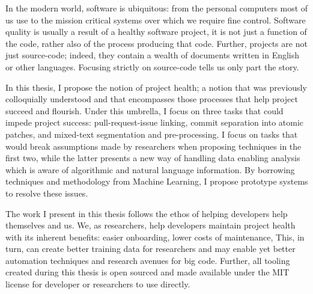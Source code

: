 In the modern world, software is ubiquitous: from the personal computers most of
us use to the mission critical systems over which we require fine control.
Software quality is usually a result of a healthy software project, \ie it is
not just a function of the code, rather also of the process producing that code.
Further, projects are not just source-code; indeed, they contain a wealth of
documents written in English or other languages. Focusing strictly on
source-code tells us only part the story.

In this thesis, I propose the notion of project health; a notion that was
previously colloquially understood and that encompasses those processes that
help project succeed and flourish. Under this umbrella, I focus on three tasks
that could impede project success: pull-request-issue linking, commit separation
into atomic patches, and mixed-text segmentation and pre-processing. I focus on
tasks that would break assumptions made by researchers when proposing techniques
in the first two, while the latter presents a new way of handling data enabling
analysis which is aware of algorithmic and natural language information. By
borrowing techniques and methodology from Machine Learning, I propose prototype
systems to resolve these issues.

The work I present in this thesis follows the ethos of helping developers help
themselves and us. We, as researchers, help developers maintain project health
with its inherent benefits: easier onboarding, lower costs of maintenance, \etc
This, in turn, can create better training data for researchers and may enable
yet better automation techniques and research avenues for big code. Further, all
tooling created during this thesis is open sourced and made available under the
MIT license for developer or researchers to use directly.